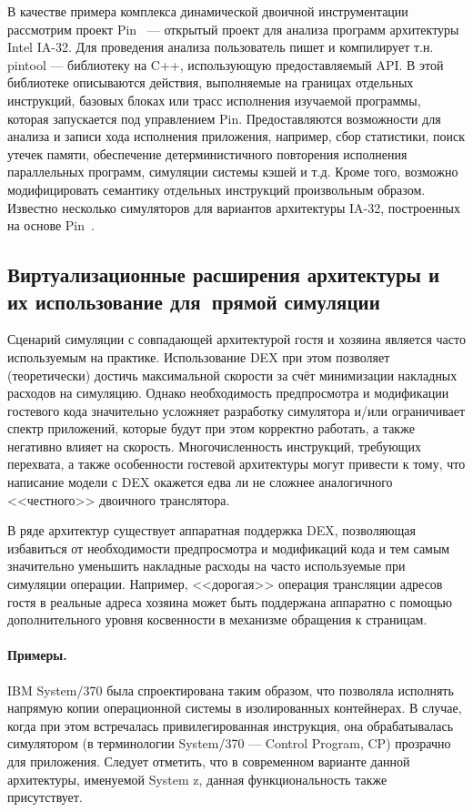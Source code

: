 В качестве примера комплекса динамической двоичной инструментации рассмотрим проект Pin~\cite{pin} --- открытый проект для анализа программ архитектуры Intel IA-32. Для проведения анализа пользователь пишет и компилирует т.н. pintool --- библиотеку на C++, использующую предоставляемый API. В этой библиотеке описываются действия, выполняемые на границах отдельных инструкций, базовых блоках или трасс исполнения изучаемой программы, которая запускается под управлением Pin. Предоставляются возможности для анализа и записи хода исполнения приложения, например, сбор статистики, поиск утечек памяти, обеспечение детерминистичного повторения исполнения параллельных программ, симуляции системы кэшей и т.д. Кроме того, возможно модифицировать семантику отдельных инструкций произвольным образом.  Известно несколько симуляторов для вариантов архитектуры IA-32, построенных на основе Pin~\cite{intel-sde, graphite2010, cmpsim, carlson2011etloafsaapms}.

\subsection[Виртуализационные расширения]{Виртуализационные расширения архитектуры и их использование для~прямой симуляции}

Сценарий симуляции с совпадающей архитектурой гостя и хозяина является часто используемым на практике. Использование DEX при этом позволяет (теоретически) достичь максимальной скорости за счёт минимизации накладных расходов на симуляцию. Однако необходимость предпросмотра и модификации гостевого кода значительно усложняет разработку симулятора и/или  ограничивает спектр приложений, которые будут при этом корректно работать, а также негативно влияет на скорость. Многочисленность инструкций, требующих перехвата, а также особенности гостевой архитектуры могут привести к тому, что написание модели с DEX окажется едва ли не сложнее аналогичного <<честного>> двоичного транслятора.

В ряде архитектур существует аппаратная поддержка DEX, позволяющая избавиться от необходимости предпросмотра и модификаций кода и тем самым значительно уменьшить накладные расходы на часто используемые при симуляции операции. Например, <<дорогая>> операция трансляции адресов гостя в реальные адреса хозяина может быть поддержана аппаратно с помощью дополнительного уровня косвенности в механизме обращения к страницам.

\paragraph{Примеры.} IBM System/370 была спроектирована таким образом, что позволяла исполнять напрямую копии операционной системы в изолированных контейнерах. В случае, когда при этом встречалась привилегированная инструкция, она обрабатывалась симулятором (в терминологии System/370 --- Control Program, CP) прозрачно для приложения. Следует отметить, что в современном варианте данной архитектуры, именуемой System z, данная функциональность также присутствует. 

